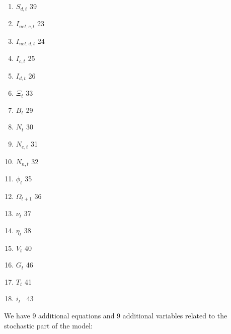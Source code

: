 \documentclass{article}
\begin{document}
\begin{enumerate}
\item $S_{d,t}$ 39

\item $I_{net,c,t}$ 23

\item $I_{net,d,t}$ 24

\item $I_{c,t}$ 25

\item $I_{d,t}$ 26

\item $\Xi _{t}$ 33

\item $B_{t}$ 29

\item $N_{t}$ 30

\item $N_{e,t}$ 31

\item $N_{n,t}$ 32

\item $\phi _{t}$ 35

\item $\Omega _{t+1}$ 36

\item $\nu _{t}$ 37

\item $\eta _{t}$ 38

\item $V_{t}$ 40

\item $G_{t}$ 46

\item $T_{t}$ 41

\item $i_{t}$ \ 43
\end{enumerate}

We have 9 additional equations and 9 additional variables related to the
stochastic part of the model:
\end{document}
